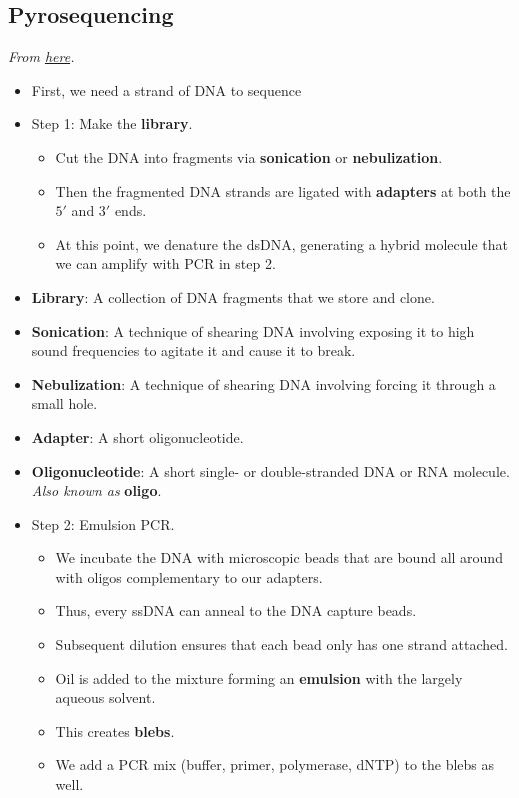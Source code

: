 \documentclass[../notes.tex]{subfiles}
\begin{document}
\subsection*{Pyrosequencing}
\emph{From \href{https://youtu.be/CdHTLLF-abA}{here}.}
\begin{itemize}
    \item First, we need a strand of DNA to sequence
    \item Step 1: Make the \textbf{library}.
    \begin{itemize}
        \item Cut the DNA into fragments via \textbf{sonication} or \textbf{nebulization}.
        \item Then the fragmented DNA strands are ligated with \textbf{adapters} at both the $5'$ and $3'$ ends.
        \item At this point, we denature the dsDNA, generating a hybrid molecule that we can amplify with PCR in step 2.
    \end{itemize}
    \item \textbf{Library}: A collection of DNA fragments that we store and clone.
    \item \textbf{Sonication}: A technique of shearing DNA involving exposing it to high sound frequencies to agitate it and cause it to break.
    \item \textbf{Nebulization}: A technique of shearing DNA involving forcing it through a small hole.
    \item \textbf{Adapter}: A short oligonucleotide.
    \item \textbf{Oligonucleotide}: A short single- or double-stranded DNA or RNA molecule. \emph{Also known as} \textbf{oligo}.
    \item Step 2: Emulsion PCR.
    \begin{itemize}
        \item We incubate the DNA with microscopic beads that are bound all around with oligos complementary to our adapters.
        \item Thus, every ssDNA can anneal to the DNA capture beads.
        \item Subsequent dilution ensures that each bead only has one strand attached.
        \item Oil is added to the mixture forming an \textbf{emulsion} with the largely aqueous solvent.
        \item This creates \textbf{blebs}.
        \item We add a PCR mix (buffer, primer, polymerase, dNTP) to the blebs as well.

\end{itemize}
\end{itemize}
\end{document}
